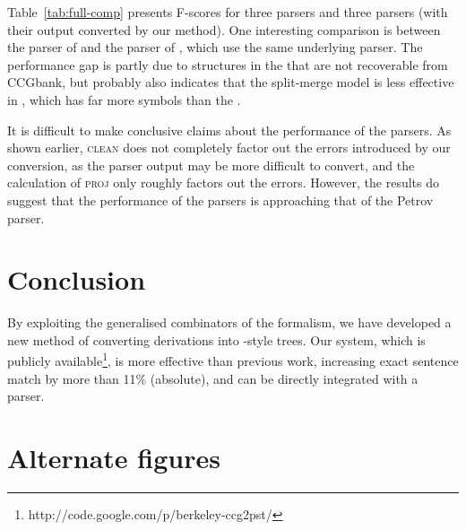 Table~\ref{tab:full-comp} presents F-scores for three \ptb parsers and three
\ccg parsers (with their output converted by our method).  One interesting
comparison is between the \ptb parser of \textcite{Petrov-Klein:2007} and the
\ccg parser of \textcite{Fowler-Penn:2010}, which use the same underlying
parser.  The performance gap is partly due to structures in the \ptb that are
not recoverable from CCGbank, but probably also indicates that the split-merge
model is less effective in \ccg, which has far more symbols than the \ptb.

It is difficult to make conclusive claims about the performance of the parsers.
As shown earlier, \textsc{clean} does not completely factor out the errors
introduced by our conversion, as the parser output may be more difficult to
convert, and the calculation of \textsc{proj} only roughly factors out the
errors.  However, the results do suggest that the performance of the \ccg
parsers is approaching that of the Petrov parser.

\section{Conclusion}

By exploiting the generalised combinators of the \ccg formalism, we have
developed a new method of converting \ccg derivations into \ptb-style trees.
Our system, which is publicly
available\footnote{http://code.google.com/p/berkeley-ccg2pst/}, is more
effective than previous work, increasing exact sentence match by more than 11\%
(absolute), and can be directly integrated with a \ccg parser.

\section{Alternate figures}

